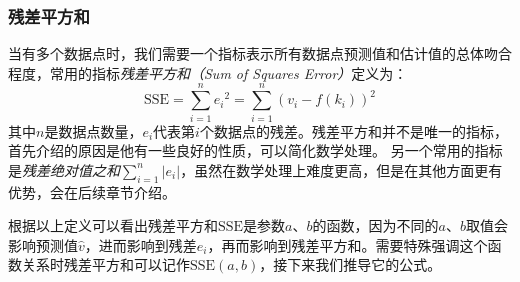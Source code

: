 \subsubsection{残差平方和}

当有多个数据点时，我们需要一个指标表示所有数据点预测值和估计值的总体吻合程度，常用的指标\emph{残差平方和（Sum of Squares Error）}定义为：
\begin{equation}\label{eq:sse}
    \text{SSE}=\sum_{i=1}^n {e_i}^2=\sum_{i=1}^n (v_i-f(k_i))^2
\end{equation}
其中$n$是数据点数量，$e_i$代表第$i$个数据点的残差。残差平方和并不是唯一的指标，首先介绍的原因是他有一些良好的性质，可以简化数学处理。
另一个常用的指标是\emph{残差绝对值之和}$\sum_{i=1}^{n}|e_i|$，虽然在数学处理上难度更高，但是在其他方面更有优势，会在后续章节介绍。

根据以上定义可以看出残差平方和$\text{SSE}$是参数$a$、$b$的函数，因为不同的$a$、$b$取值会影响预测值$\hat{v}$，进而影响到残差$e_i$，再而影响到残差平方和。需要特殊强调这个函数关系时残差平方和可以记作$\text{SSE}(a,b)$，接下来我们推导它的公式。

